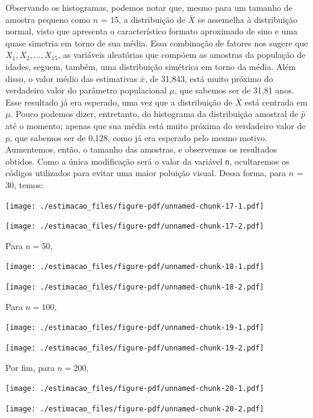 \documentclass[
  letterpaper,
  DIV=11,
  numbers=noendperiod]{scrreprt}
\begin{document}
Observando os histogramas, podemos notar que, mesmo para um tamanho de
amostra pequeno como \(n\) = 15, a distribuição de \(\bar{X}\) se
assemelha à distribuição normal, visto que apresenta o característico
formato aproximado de sino e uma quase simetria em torno de sua média.
Essa combinação de fatores nos sugere que \(X_1, X_2, ..., X_{15}\), as
variáveis aleatórias que compõem as amostras da população de idades,
seguem, também, uma distribuição simétrica em torno da média. Além
disso, o valor médio das estimativas \(\bar{x}\), de 31,843, está muito
próximo do verdadeiro valor do parâmetro populacional \(\mu\), que
sabemos ser de 31,81 anos. Esse resultado já era esperado, uma vez que a
distribuição de \(\bar{X}\) está centrada em \(\mu\). Pouco podemos
dizer, entretanto, do histograma da distribuição amostral de \(\hat{p}\)
até o momento; apenas que sua média está muito próxima do verdadeiro
valor de \(p\), que sabemos ser de 0,128, como já era esperado pelo
mesmo motivo. Aumentemos, então, o tamanho das amostras, e observemos os
resultados obtidos. Como a única modificação será o valor da variável
\texttt{n}, ocultaremos os códigos utilizados para evitar uma maior
poluição visual. Dessa forma, para \(n\) = 30, temos:

\texttt{[image: ./estimacao\_files/figure-pdf/unnamed-chunk-17-1.pdf]}

\texttt{[image: ./estimacao\_files/figure-pdf/unnamed-chunk-17-2.pdf]}

Para \(n = 50\),

\texttt{[image: ./estimacao\_files/figure-pdf/unnamed-chunk-18-1.pdf]}

\texttt{[image: ./estimacao\_files/figure-pdf/unnamed-chunk-18-2.pdf]}

Para \(n = 100\),

\texttt{[image: ./estimacao\_files/figure-pdf/unnamed-chunk-19-1.pdf]}

\texttt{[image: ./estimacao\_files/figure-pdf/unnamed-chunk-19-2.pdf]}

Por fim, para \(n = 200\),

\texttt{[image: ./estimacao\_files/figure-pdf/unnamed-chunk-20-1.pdf]}

\texttt{[image: ./estimacao\_files/figure-pdf/unnamed-chunk-20-2.pdf]}
\end{document}
